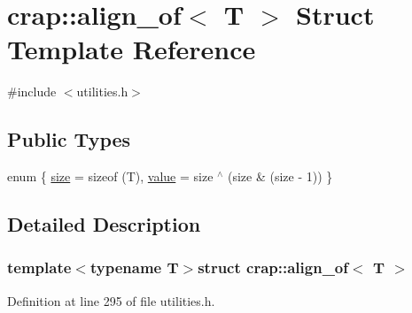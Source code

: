\hypertarget{structcrap_1_1align__of}{}\section{crap\+:\+:align\+\_\+of$<$ T $>$ Struct Template Reference}
\label{structcrap_1_1align__of}


{\ttfamily \#include $<$utilities.\+h$>$}

\subsection*{Public Types}
\begin{DoxyCompactItemize}
\item 
enum \{ \hyperlink{structcrap_1_1align__of_ae6e1e0ba0f4e74c10d92aa8849e230e5a8b5c1072cbffe59ec024940bd1bcbe2b}{size} = sizeof (T), 
\hyperlink{structcrap_1_1align__of_ae6e1e0ba0f4e74c10d92aa8849e230e5a681bb33919188c1863cff58c23b72e69}{value} = size $^\wedge$ (size \& (size -\/ 1))
 \}
\end{DoxyCompactItemize}


\subsection{Detailed Description}
\subsubsection*{template$<$typename T$>$struct crap\+::align\+\_\+of$<$ T $>$}



Definition at line 295 of file utilities.\+h.



